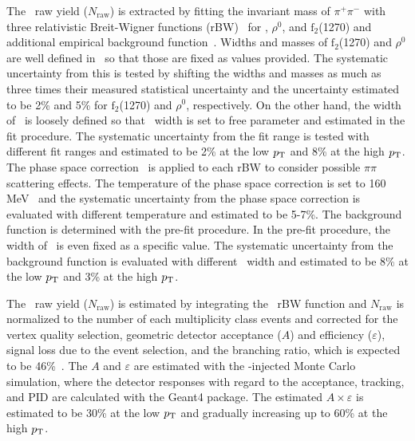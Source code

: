 \documentclass[ALICE,manyauthors]{cernphprep}
\begin{document}
The \fzero~raw yield ($N_{\mathrm{raw}}$) is extracted by fitting the invariant mass of $\pi^{+}\pi^{-}$ with three relativistic Breit-Wigner functions (rBW)~\cite{ALICE:2015nbw} for \fzero, $\rho^{0}$, and $\mathrm{f}_{2}$(1270) and additional empirical background function~\cite{OPAL:1998enc}. Widths and masses of $\mathrm{f}_{2}$(1270) and $\rho^{0}$ are well defined in~\cite{ParticleDataGroup:2020ssz} so that those are fixed as values provided. The systematic uncertainty from this is tested by shifting the widths and masses as much as three times their measured statistical uncertainty and the uncertainty estimated to be 2\% and 5\% for $\mathrm{f}_{2}$(1270) and $\rho^{0}$, respectively. On the other hand, the width of \fzero~is loosely defined so that \fzero~width is set to free parameter and estimated in the fit procedure. The systematic uncertainty from the fit range is tested with different fit ranges and estimated to be 2\% at the low $p_{\rm{T}}$ and 8\% at the high $p_{\rm{T}}$. The phase space correction~\cite{Rapp:2003ar} is applied to each rBW to consider possible $\pi\pi$ scattering effects. The temperature of the phase space correction is set to 160 MeV~\cite{ALICE:2013wgn} and the systematic uncertainty from the phase space correction is evaluated with different temperature and estimated to be 5-7\%. The background function is determined with the pre-fit procedure. In the pre-fit procedure, the width of \fzero~is even fixed as a specific value. The systematic uncertainty from the background function is evaluated with different \fzero~width and estimated to be 8\% at the low $p_{\rm{T}}$ and 3\% at the high $p_{\rm{T}}$.

The \fzero~raw yield ($N_{\mathrm{raw}}$) is estimated by integrating the \fzero~rBW function and $N_{\mathrm{raw}}$ is normalized to the number of each multiplicity class events and corrected for the vertex quality selection, geometric detector acceptance ($A$) and efficiency ($\varepsilon$), signal loss due to the event selection, and the branching ratio, which is expected to be 46\%~\cite{Stone:2013eaa}. The $A$ and $\varepsilon$ are estimated with the \fzero-injected Monte Carlo simulation, where the detector responses with regard to the acceptance, tracking, and PID are calculated with the Geant4 package. The estimated $A \times \varepsilon$ is estimated to be 30\% at the low $p_{\rm{T}}$ and gradually increasing up to 60\% at the high $p_{\rm{T}}$.
\end{document}
